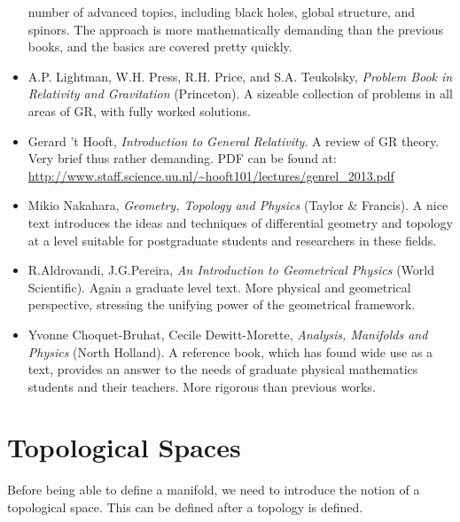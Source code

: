 \documentclass[a4paper,11pt]{article}
\theoremstyle{remark}
\begin{document}
\begin{itemize}
  number of advanced topics, including black holes, global structure,
  and spinors. The approach is more mathematically demanding than the
  previous books, and the basics are covered pretty quickly.
\item A.P. Lightman, W.H. Press, R.H. Price, and S.A. Teukolsky,
  \textit{Problem Book in Relativity and Gravitation} (Princeton). A
  sizeable collection of problems in all areas of GR, with fully
  worked solutions.
\item Gerard 't Hooft, \textit{Introduction to General Relativity}. A
  review of GR theory. Very brief thus rather demanding. PDF can be
  found at:
  \url{http://www.staff.science.uu.nl/~hooft101/lectures/genrel_2013.pdf}
\item Mikio Nakahara, \textit{Geometry, Topology and Physics} (Taylor
  \& Francis). A nice text introduces the ideas and techniques of
  differential geometry and topology at a level suitable for
  postgraduate students and researchers in these fields.
\item R.Aldrovandi, J.G.Pereira, \textit{An Introduction to
    Geometrical Physics} (World Scientific). Again a graduate level
  text. More physical and geometrical perspective, stressing the
  unifying power of the geometrical framework.
\item Yvonne Choquet-Bruhat, Cecile Dewitt-Morette, \textit{Analysis,
    Manifolds and Physics} (North Holland). A reference book, which
  has found wide use as a text, provides an answer to the needs of
  graduate physical mathematics students and their teachers. More
  rigorous than previous works.
\end{itemize}

\clearpage

\section{Topological Spaces}
\label{s:topo}
Before being able to define a manifold, we need to introduce the
notion of a topological space. This can be defined after a topology is defined.
\end{document}
